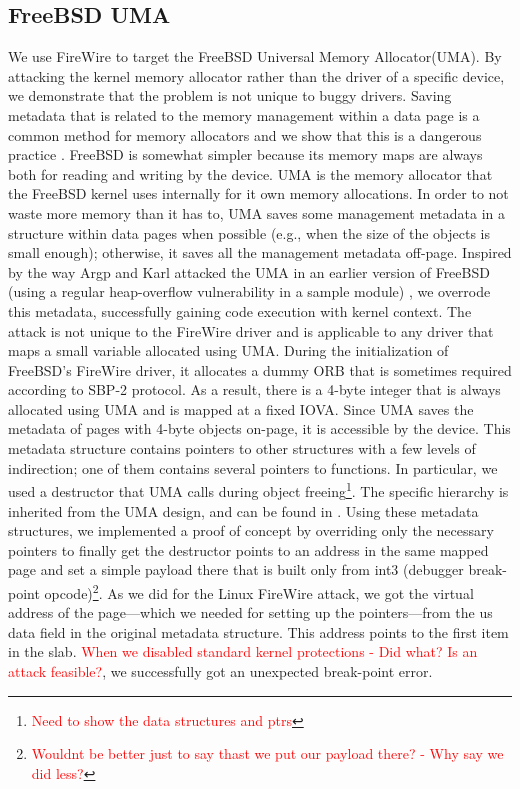 \subsection{FreeBSD UMA}
We use FireWire to target the FreeBSD Universal Memory Allocator(UMA). By attacking the kernel memory allocator rather than the driver of a specific device, we demonstrate that the problem is not unique to buggy drivers. Saving metadata that is related to the memory management within a data page is a common method for memory allocators and we show that this is a dangerous practice \cite{Cor07, ak09}. FreeBSD is somewhat simpler because its memory maps are always both for reading and writing by the device. UMA is the memory allocator that the FreeBSD kernel uses internally for it own memory allocations. In order to not waste more memory than it has to, UMA saves some management metadata in a structure within data pages when possible (e.g., when the size of the objects is small enough); otherwise, it saves all the management metadata off-page. Inspired by the way Argp and Karl attacked the UMA in an earlier version of FreeBSD (using a regular heap-overflow vulnerability in a sample module) \cite{ak09}, we overrode this metadata, successfully gaining code execution with kernel context. The attack is not unique to the FireWire driver and is applicable to any driver that maps a small variable allocated using UMA. During the initialization of FreeBSD’s FireWire driver, it allocates a dummy ORB that is sometimes required according to SBP-2 protocol. As a result, there is a 4-byte integer that is always allocated using UMA and is mapped at a fixed IOVA. Since UMA saves the metadata of pages with 4-byte objects on-page, it is accessible by the device. This metadata structure contains pointers to other structures with a few levels of indirection; one of them contains several pointers to functions. In particular, we used a destructor that UMA calls during object freeing\footnote{\textcolor{red}{Need to show the data structures and ptrs}}. The specific hierarchy is inherited from the UMA design, and can be found in \cite{aA10}. Using these metadata structures, we implemented a proof of concept by overriding only the necessary pointers to finally get the destructor points to an address in the same mapped page and set a simple payload there that is built only from int3 (debugger break-point opcode)\footnote{\textcolor{red}{Wouldnt be better just to say thast we put our payload there? - Why say we did less?}}. As we did for the Linux FireWire attack, we got the virtual address of the page—which we needed for setting up the pointers—from the us data field in the original metadata structure. This address points to the first item in the slab. \textcolor{red}{When we disabled standard kernel protections - Did what? Is an attack feasible?}, we successfully got an unexpected break-point error.